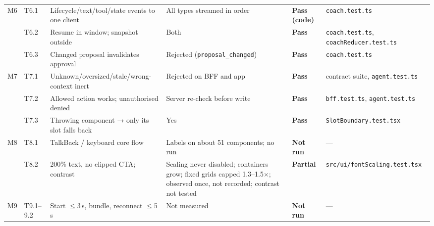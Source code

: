 \documentclass[11pt,a4paper]{article}
\newcommand{\pass}{\textcolor{okgreen}{\textbf{Pass}}}
\newcommand{\passcode}{\textcolor{okgreen}{\textbf{Pass (code)}}}
\newcommand{\partl}{\textcolor{partial}{\textbf{Partial}}}
\newcommand{\notrun}{\textcolor{notdone}{\textbf{Not run}}}
\newcommand{\fp}[1]{\nolinkurl{#1}}
\begin{document}
\begin{xltabular}{\textwidth}{L{0.04\textwidth}L{0.07\textwidth}L{0.23\textwidth}L{0.25\textwidth}L{0.1\textwidth}Y}
M6 & T6.1 & Lifecycle/text/tool/state events to one client & All types streamed in order & \passcode & \fp{coach.test.ts} \\
 & T6.2 & Resume in window; snapshot outside & Both & \pass & \fp{coach.test.ts}, \fp{coachReducer.test.ts} \\
 & T6.3 & Changed proposal invalidates approval & Rejected (\texttt{proposal\_changed}) & \pass & \fp{coach.test.ts} \\
M7 & T7.1 & Unknown/oversized/stale/wrong-context inert & Rejected on BFF and app & \pass & contract suite, \fp{agent.test.ts} \\
 & T7.2 & Allowed action works; unauthorised denied & Server re-check before write & \pass & \fp{bff.test.ts}, \fp{agent.test.ts} \\
 & T7.3 & Throwing component → only its slot falls back & Yes & \pass & \fp{SlotBoundary.test.tsx} \\
M8 & T8.1 & TalkBack / keyboard core flow & Labels on about 51 components; no run & \notrun & — \\
 & T8.2 & 200\% text, no clipped CTA; contrast & Scaling never disabled; containers grow; fixed grids capped 1.3–1.5$\times$; observed once, not recorded; contrast not tested & \partl & \fp{src/ui/fontScaling.test.tsx} \\
M9 & T9.1–9.2 & Start $\le$3\,s, bundle, reconnect $\le$5\,s & Not measured & \notrun & — \\
\bottomrule
\end{xltabular}
\end{document}
